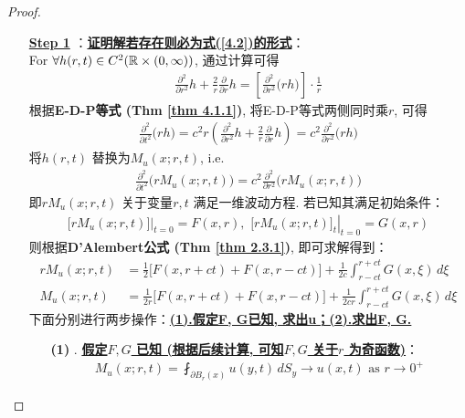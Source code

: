 \begin{thm}
\begin{proof}
			\begin{enumerate}
				\item[\underline{\textbf{Step 1}}]：\underline{\textbf{证明解若存在则必为式(\ref{4.2})的形式}}：\\
				For $\forall h(r , t) \in C^2(\mathbb{R} \times (0 , \infty))$, 通过计算可得
				\begin{align*}
					\frac{\partial^2}{\partial r^2} h + \frac{2}{r} \frac{\partial}{\partial r} h 
					= \left[ \frac{\partial^2}{\partial r^2} \Big( rh \Big) \right] \cdot \frac{1}{r}
				\end{align*}
				根据\textbf{E-D-P等式 (Thm \ref{thm 4.1.1})}, 将E-D-P等式两侧同时乘$r$, 可得
				\begin{align*}
					\frac{\partial^2}{\partial t^2} \Big( r h \Big) 
					= c^2 r \left( \frac{\partial^2}{\partial r^2} h + \frac{2}{r} \frac{\partial}{\partial r} h \right) 
					= c^2 \frac{\partial^2}{\partial r^2} \Big( r h \Big) 
				\end{align*}
				将$h(r , t)$ 替换为$M_u(x ; r , t)$, i.e.
				\begin{align*}
					\frac{\partial^2}{\partial t^2} \Big( r M_u(x ; r , t) \Big) 
					= c^2 \frac{\partial^2}{\partial r^2} \Big( r M_u(x ; r , t) \Big)
				\end{align*}
				即$r M_u(x ; r , t)$ 关于变量$r , t$ 满足一维波动方程. 若已知其满足初始条件：
				\begin{align*}
					\left. \Big[ r M_u(x ; r , t) \Big] \right|_{t = 0} 
					= F(x , r) , \,\, 
					\left. \Big[ rM_{u}(x ; r , t) \Big]_t \right|_{t = 0} 
					= G(x , r)
				\end{align*}
				则根据\textbf{D'Alembert公式 (Thm \ref{thm 2.3.1})}, 即可求解得到：
				\begin{align*}
					rM_{u}(x ; r , t) 
					&= \frac{1}{2} \Big[ F(x , r + ct) + F(x , r - ct) \Big] + \frac{1}{2c} \int_{r - ct}^{r + ct} G(x , \xi) \, d\xi \\
					M_{u}(x ; r , t) 
					&= \frac{1}{2r} \Big[ F(x , r + ct) + F(x , r - ct) \Big] + \frac{1}{2cr} \int_{r - ct}^{r + ct} G(x , \xi) \, d\xi
				\end{align*}
				下面分别进行两步操作：\underline{\textbf{(1).假定F, G已知, 求出u；(2).求出F, G.}}
				
				\vspace*{1em}
				
				\begin{enumerate}
					\item[\textbf{(1)}]. \textbf{\underline{假定$F , G$ 已知 (根据后续计算, 可知$F , G$ 关于$r$ 为奇函数)}}：
					\begin{align*}
						M_{u}(x ; r , t) 
						= \fint_{\partial B_{r}(x)} u(y , t) \, dS_y \to u(x , t) \,\, \text{as} \,\, r \to 0^+
					\end{align*}
					

\end{enumerate}
\end{enumerate}
\end{proof}
\end{thm}

